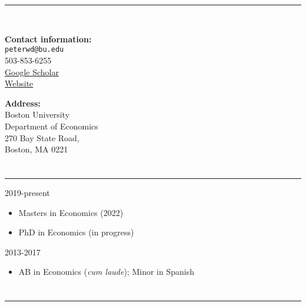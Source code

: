 \documentclass[12pt]{article}
\newenvironment{customitemize}
{ \begin{itemize}[leftmargin=\parindent, topsep = 1pt, itemsep = -1pt] }
{\end{itemize} }
\begin{document}
\normalsize
\singlespacing


\newcommand{\link}[2]{{\color{blue}\href{#1}{#2}}}

\section*{\centering {}} 
\begin{center}
\rule{3in}{1pt} \\
\vspace*{0.1in}

\begin{minipage}[t]{3in}
\textbf{Contact information:} \\
\texttt{peterwd@bu.edu} \\
503-853-6255 \\
\href{https://scholar.google.com/citations?user=zMlunv0AAAAJ&hl=en}{Google Scholar} \\
\href{https://pdeffebach.github.io}{Website} \\
\end{minipage}
\hfill
\begin{minipage}[t]{2.0in}
\textbf{Address:}\\
Boston University \\
Department of Economics \\
270 Bay State Road, \\
Boston, MA 0221
\end{minipage}

\end{center} 

\section*{}
\noindent \rule{\textwidth}{1pt} 
  \hfill 2019-present 
\begin{customitemize}
	\item Masters in Economics (2022)
	\item PhD in Economics (in progress)
\end{customitemize}
  \hfill 2013-2017 
\begin{customitemize}
	\item AB in Economics (\emph{cum laude}); Minor in Spanish
\end{customitemize}

\section*{}
\noindent \rule{\textwidth}{1pt} 
\end{document}
